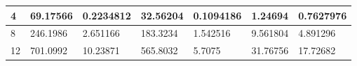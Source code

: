 \begin{table}
\begin{tabular}{|l|l|l|l|l|l|l|}
4                                                                                   & 69.17566                                                                                                                    & 0.2234812                                                                                                                                       & 32.56204                                                                                                                                        & 0.1094186                                                                                                                                        & 1.24694                                                                                                                                      & 0.7627976                                                                                                                                      \\ \hline
8                                                                                   & 246.1986                                                                                                                    & 2.651166                                                                                                                                        & 183.3234                                                                                                                                        & 1.542516                                                                                                                                         & 9.561804                                                                                                                                     & 4.891296                                                                                                                                       \\ \hline
12                                                                                  & 701.0992                                                                                                                    & 10.23871                                                                                                                                        & 565.8032                                                                                                                                        & 5.7075                                                                                                                                           & 31.76756                                                                                                                                     & 17.72682                                                                                                                                       \\ \hline

\end{tabular}
\end{table}
